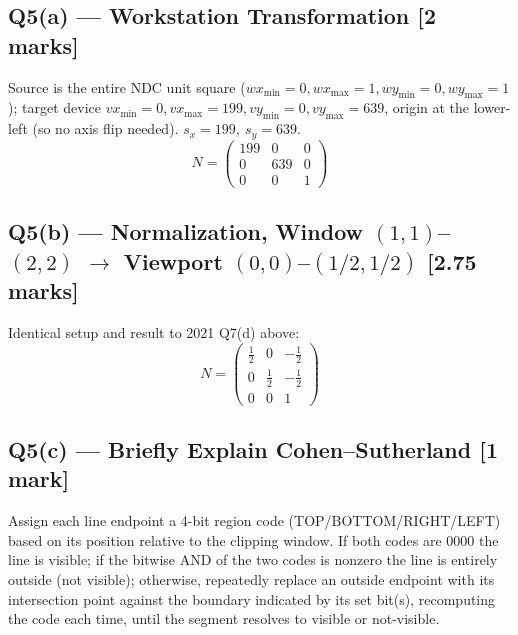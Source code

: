 \documentclass[12pt, a4paper]{article}
\newenvironment{solutionbox}{\begin{mdframed}[style=solutionframe]}{\end{mdframed}}
\newenvironment{answerbox}{\begin{mdframed}[style=answerframe]}{\end{mdframed}}
\begin{document}
\subsection*{Q5(a) --- Workstation Transformation [2 marks]}
\begin{solutionbox}
Source is the entire NDC unit square ($wx_{\min}=0,wx_{\max}=1,wy_{\min}=0,wy_{\max}=1$); target device $vx_{\min}=0,vx_{\max}=199,vy_{\min}=0,vy_{\max}=639$, origin at the lower-left (so no axis flip needed). $s_x=199,\ s_y=639$.
$$N = \begin{pmatrix}199&0&0\\0&639&0\\0&0&1\end{pmatrix}$$
\end{solutionbox}

\subsection*{Q5(b) --- Normalization, Window $(1,1)$--$(2,2)$ $\to$ Viewport $(0,0)$--$(1/2,1/2)$ [2.75 marks]}
\begin{solutionbox}
Identical setup and result to 2021 Q7(d) above:
$$N=\begin{pmatrix}\tfrac12&0&-\tfrac12\\0&\tfrac12&-\tfrac12\\0&0&1\end{pmatrix}$$
\end{solutionbox}

\subsection*{Q5(c) --- Briefly Explain Cohen--Sutherland [1 mark]}
\begin{answerbox}
Assign each line endpoint a 4-bit region code (TOP/BOTTOM/RIGHT/LEFT) based on its position relative to the clipping window. If both codes are $0000$ the line is visible; if the bitwise AND of the two codes is nonzero the line is entirely outside (not visible); otherwise, repeatedly replace an outside endpoint with its intersection point against the boundary indicated by its set bit(s), recomputing the code each time, until the segment resolves to visible or not-visible.
\end{answerbox}
\end{document}
